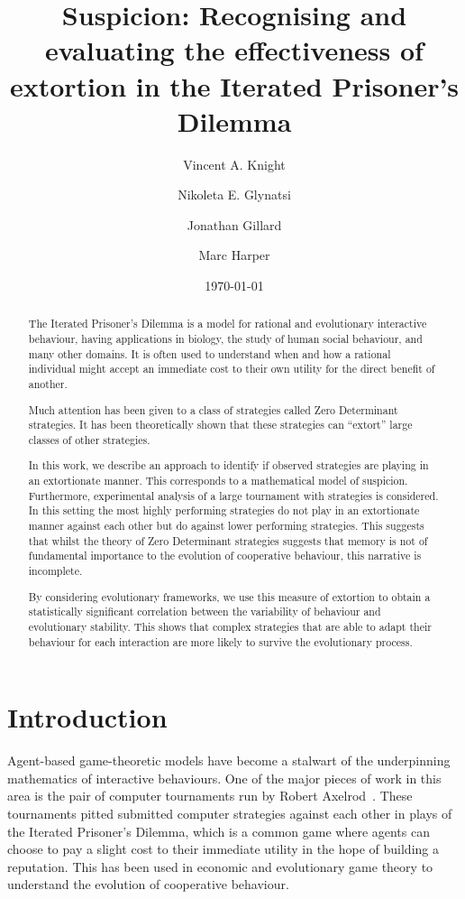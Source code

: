 \documentclass[a4paper]{article}
\title{Suspicion: Recognising and evaluating the effectiveness
       of extortion in the Iterated Prisoner's Dilemma}
\author{Vincent A. Knight \and
        Nikoleta E. Glynatsi \and
        Jonathan Gillard \and
        Marc Harper}
\date{\today}
\begin{document}
\maketitle

\begin{abstract}
    The Iterated Prisoner's Dilemma is a model for rational and evolutionary
    interactive behaviour, having applications in biology, the study of human
    social behaviour, and many other domains.  It is often used to understand
    when and how a rational individual might accept an immediate cost to their
    own utility for the direct benefit of another.

    Much attention has been given to a class of strategies called
    Zero Determinant strategies. It has been theoretically shown that these
    strategies can ``extort'' large classes of other strategies.

    In this work, we describe an approach to identify if observed strategies are
    playing in an extortionate manner. This corresponds to a mathematical model
    of suspicion. Furthermore, experimental analysis of a large tournament with
    strategies is
    considered. In this setting the most highly performing strategies do not
    play in an extortionate manner against each other but do against lower
    performing strategies.  This suggests that whilst the theory of Zero
    Determinant strategies suggests that memory is not of fundamental importance
    to the evolution of cooperative behaviour, this narrative is incomplete.

    By considering evolutionary frameworks, we use this measure of extortion to
    obtain a statistically significant correlation between the variability of
    behaviour and evolutionary stability. This shows that complex strategies
    that are able to adapt their behaviour for each interaction are more likely 
    to survive the evolutionary process.
\end{abstract}

\section{Introduction}\label{sec:introduction}

Agent-based game-theoretic models have become a stalwart of the underpinning
mathematics of interactive behaviours. One of the major pieces of work in this
area is the pair of computer tournaments run by Robert
Axelrod~\cite{Axelrod1980, Axelrod1980a}. These tournaments pitted submitted
computer strategies against each other in plays of the Iterated Prisoner's
Dilemma, which is a common game where agents can choose to pay a slight cost to
their immediate utility in the hope of building a reputation. This has been used
in economic and evolutionary game theory to understand the evolution of
cooperative behaviour.
\end{document}
